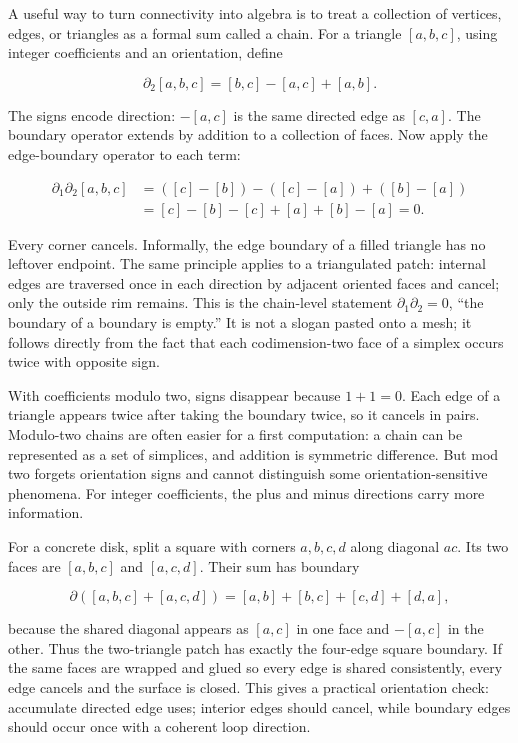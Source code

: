 A useful way to turn connectivity into algebra is to treat a collection of vertices, edges, or triangles as a formal sum called a chain. For a triangle \([a,b,c]\), using integer coefficients and an orientation, define

\[
\partial_2[a,b,c]=[b,c]-[a,c]+[a,b].
\]

The signs encode direction: \(-[a,c]\) is the same directed edge as \([c,a]\). The boundary operator extends by addition to a collection of faces. Now apply the edge-boundary operator to each term:

\[
\begin{aligned}
\partial_1\partial_2[a,b,c]
&=([c]-[b])-([c]-[a])+([b]-[a])\\
&=[c]-[b]-[c]+[a]+[b]-[a]=0.
\end{aligned}
\]

Every corner cancels. Informally, the edge boundary of a filled triangle has no leftover endpoint. The same principle applies to a triangulated patch: internal edges are traversed once in each direction by adjacent oriented faces and cancel; only the outside rim remains. This is the chain-level statement \(\partial_1\partial_2=0\), ``the boundary of a boundary is empty.'' It is not a slogan pasted onto a mesh; it follows directly from the fact that each codimension-two face of a simplex occurs twice with opposite sign.

With coefficients modulo two, signs disappear because \(1+1=0\). Each edge of a triangle appears twice after taking the boundary twice, so it cancels in pairs. Modulo-two chains are often easier for a first computation: a chain can be represented as a set of simplices, and addition is symmetric difference. But mod two forgets orientation signs and cannot distinguish some orientation-sensitive phenomena. For integer coefficients, the plus and minus directions carry more information.

For a concrete disk, split a square with corners \(a,b,c,d\) along diagonal \(ac\). Its two faces are \([a,b,c]\) and \([a,c,d]\). Their sum has boundary

\[
\partial([a,b,c]+[a,c,d])=[a,b]+[b,c]+[c,d]+[d,a],
\]

because the shared diagonal appears as \([a,c]\) in one face and \(-[a,c]\) in the other. Thus the two-triangle patch has exactly the four-edge square boundary. If the same faces are wrapped and glued so every edge is shared consistently, every edge cancels and the surface is closed. This gives a practical orientation check: accumulate directed edge uses; interior edges should cancel, while boundary edges should occur once with a coherent loop direction.

